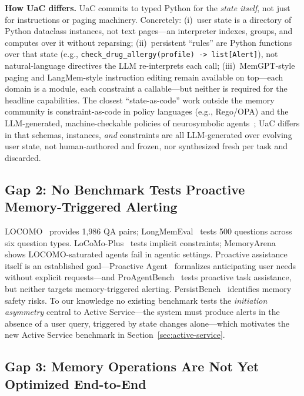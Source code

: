 \textbf{How UaC differs.} UaC commits to typed Python for the \emph{state itself}, not just for instructions or paging machinery. Concretely: (i)~user state is a directory of Python dataclass instances, not text pages---an interpreter indexes, groups, and computes over it without reparsing; (ii)~persistent ``rules'' are Python functions over that state (e.g., \texttt{check\_drug\_allergy(profile) -> list[Alert]}), not natural-language directives the LLM re-interprets each call; (iii)~MemGPT-style paging and LangMem-style instruction editing remain available on top---each domain is a module, each constraint a callable---but neither is required for the headline capabilities. The closest ``state-as-code'' work outside the memory community is constraint-as-code in policy languages (e.g., Rego/OPA) and the LLM-generated, machine-checkable policies of neurosymbolic agents~\citep{liang2023codeaspolicies, akinfaderin2025verafi}; UaC differs in that schemas, instances, \emph{and} constraints are all LLM-generated over evolving user state, not human-authored and frozen, nor synthesized fresh per task and discarded.

\subsection{Gap 2: No Benchmark Tests Proactive Memory-Triggered Alerting}

LOCOMO~\citep{maharana2024locomo} provides 1,986 QA pairs; LongMemEval~\citep{wu2025longmemeval} tests 500 questions across six question types. LoCoMo-Plus~\citep{li2026locomoplus} tests implicit constraints; MemoryArena~\citep{he2026memoryarena} shows LOCOMO-saturated agents fail in agentic settings. Proactive assistance itself is an established goal---Proactive Agent~\citep{lu2025proactive} formalizes anticipating user needs without explicit requests---and ProAgentBench~\citep{tang2026proagentbench} tests proactive task assistance, but neither targets memory-triggered alerting. PersistBench~\citep{pulipaka2026persistbench} identifies memory safety risks. To our knowledge no existing benchmark tests the \emph{initiation asymmetry} central to Active Service---the system must produce alerts in the absence of a user query, triggered by state changes alone---which motivates the new Active Service benchmark in Section~\ref{sec:active-service}.

\subsection{Gap 3: Memory Operations Are Not Yet Optimized End-to-End}

